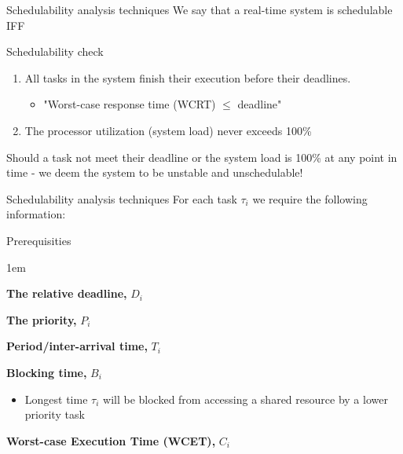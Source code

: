 \begin{frame}{Schedulability analysis techniques}
    We say that a real-time system is schedulable IFF
    \begin{block}{Schedulability check}
        \begin{enumerate}
            \item All tasks in the system finish their execution before their deadlines.
            \begin{itemize}
                \item "Worst-case response time (WCRT) $\leq$ deadline"
            \end{itemize}
            \item The processor utilization (system load) never exceeds 100\%
        \end{enumerate}
    \end{block}
    Should a task not meet their deadline or the system load is 100\% at any point
    in time - we deem the system to be unstable and unschedulable!
\end{frame}

\begin{frame}{Schedulability analysis techniques}
    For each task $\tau_i$ we require the following information:
    \begin{block}{Prerequisities}
        \begin{itemize-size}{1em}
            \item \textbf{The relative deadline,} $D_i$
            \item \textbf{The priority,} $P_i$
            \item \textbf{Period/inter-arrival time,} $T_i$
            \item \textbf{Blocking time,} $B_i$
            \begin{itemize}
                \item Longest time $\tau_i$ will be blocked from
                accessing a shared resource by a lower priority
                task
            \end{itemize}
            \item \textbf{Worst-case Execution Time (WCET),} $C_i$
        \end{itemize-size} 
    \end{block}

\end{frame}

